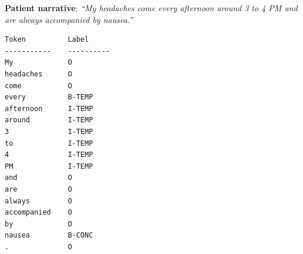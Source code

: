 \textbf{Patient narrative}: \textit{``My headaches come every afternoon around 3 to 4 PM and are always accompanied by nausea.''}

\begin{verbatim}
Token          Label
-----------    ----------
My             O
headaches      O
come           O
every          B-TEMP
afternoon      I-TEMP
around         I-TEMP
3              I-TEMP
to             I-TEMP
4              I-TEMP
PM             I-TEMP
and            O
are            O
always         O
accompanied    O
by             O
nausea         B-CONC
.              O
\end{verbatim}
